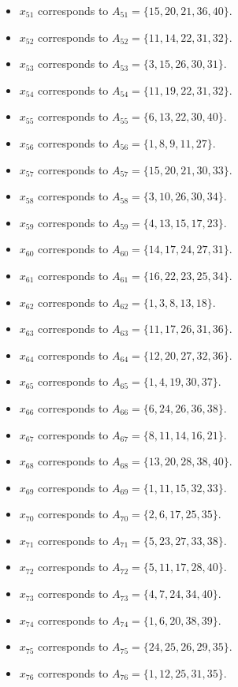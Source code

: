 \documentclass[11pt]{article}
\begin{document}
\begin{itemize}
\item $x_{51}$ corresponds to $A_{51}=\{15, 20, 21, 36, 40\}$.
\item $x_{52}$ corresponds to $A_{52}=\{11, 14, 22, 31, 32\}$.
\item $x_{53}$ corresponds to $A_{53}=\{3, 15, 26, 30, 31\}$.
\item $x_{54}$ corresponds to $A_{54}=\{11, 19, 22, 31, 32\}$.
\item $x_{55}$ corresponds to $A_{55}=\{6, 13, 22, 30, 40\}$.
\item $x_{56}$ corresponds to $A_{56}=\{1, 8, 9, 11, 27\}$.
\item $x_{57}$ corresponds to $A_{57}=\{15, 20, 21, 30, 33\}$.
\item $x_{58}$ corresponds to $A_{58}=\{3, 10, 26, 30, 34\}$.
\item $x_{59}$ corresponds to $A_{59}=\{4, 13, 15, 17, 23\}$.
\item $x_{60}$ corresponds to $A_{60}=\{14, 17, 24, 27, 31\}$.
\item $x_{61}$ corresponds to $A_{61}=\{16, 22, 23, 25, 34\}$.
\item $x_{62}$ corresponds to $A_{62}=\{1, 3, 8, 13, 18\}$.
\item $x_{63}$ corresponds to $A_{63}=\{11, 17, 26, 31, 36\}$.
\item $x_{64}$ corresponds to $A_{64}=\{12, 20, 27, 32, 36\}$.
\item $x_{65}$ corresponds to $A_{65}=\{1, 4, 19, 30, 37\}$.
\item $x_{66}$ corresponds to $A_{66}=\{6, 24, 26, 36, 38\}$.
\item $x_{67}$ corresponds to $A_{67}=\{8, 11, 14, 16, 21\}$.
\item $x_{68}$ corresponds to $A_{68}=\{13, 20, 28, 38, 40\}$.
\item $x_{69}$ corresponds to $A_{69}=\{1, 11, 15, 32, 33\}$.
\item $x_{70}$ corresponds to $A_{70}=\{2, 6, 17, 25, 35\}$.
\item $x_{71}$ corresponds to $A_{71}=\{5, 23, 27, 33, 38\}$.
\item $x_{72}$ corresponds to $A_{72}=\{5, 11, 17, 28, 40\}$.
\item $x_{73}$ corresponds to $A_{73}=\{4, 7, 24, 34, 40\}$.
\item $x_{74}$ corresponds to $A_{74}=\{1, 6, 20, 38, 39\}$.
\item $x_{75}$ corresponds to $A_{75}=\{24, 25, 26, 29, 35\}$.
\item $x_{76}$ corresponds to $A_{76}=\{1, 12, 25, 31, 35\}$.

\end{itemize}
\end{document}
